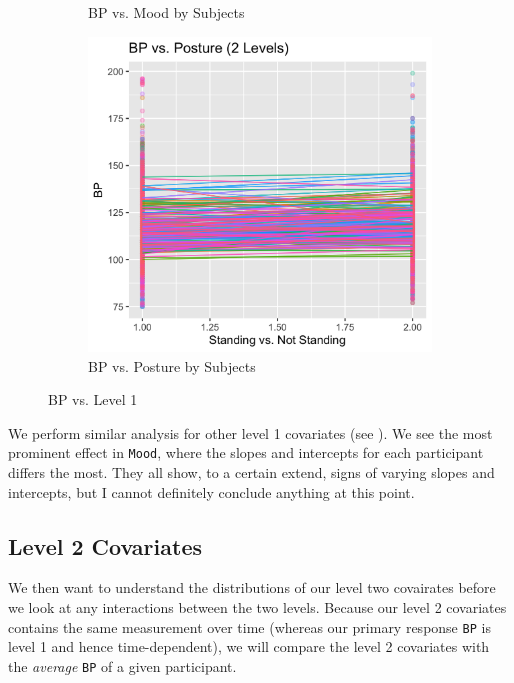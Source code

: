 \documentclass[12pt,twoside,leqno,fleqn,letterpaper]{article}
\theoremstyle{definition}
\theoremstyle{definition}
\begin{document}
\begin{figure}
\begin{subfigure}[b]{0.29\textwidth}
    \caption[]%
    {{\small BP vs. Mood by Subjects}}
    \label{fig: bp v mood}
    \end{subfigure}
    \hfill
    \begin{subfigure}[b]{0.29\textwidth}
    \centering
    \includegraphics[width=\textwidth]{pics/bp v stand.png}
    \caption[]%
    {{\small BP vs. Posture by Subjects}}
    \label{fig: bp v stand}
    \end{subfigure}
    \caption[]
    {\small BP vs. Level 1}
    \label{fig: bp v level1}
    \end{figure}

We perform similar analysis for other level 1 covariates (see ). We see the most prominent effect in \texttt{Mood}, where the slopes and intercepts for each participant differs the most. They all show, to a certain extend, signs of varying slopes and intercepts, but I cannot definitely conclude anything at this point.

\subsection{Level 2 Covariates}

We then want to understand the distributions of our level two covairates before we look at any interactions between the two levels. Because our level 2 covariates contains the same measurement over time (whereas our primary response \texttt{BP} is level 1 and hence time-dependent), we will compare the level 2 covariates with the \emph{average} \texttt{BP} of a given participant.
\end{document}
